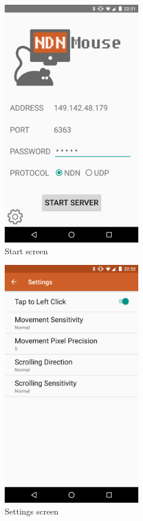 \documentclass{sig-alternate}
\renewcommand\_{\textunderscore\allowbreak}  %
\begin{document}
\begin{figure}[ht]
	\hypertarget{fig:start}{}
	\centering
	\caption{Start screen}
	\includegraphics[width=6cm]{screenshots/start}
\end{figure}

\begin{figure}[ht]
	\hypertarget{fig:settings}{}
	\centering
	\caption{Settings screen}
	\includegraphics[width=6cm]{screenshots/settings}
\end{figure}
\end{document}
